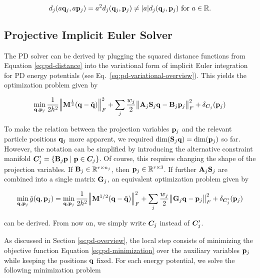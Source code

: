 \[
    d_j(a\mathbf{q}_j, a\mathbf{p}_j) = a^2d_j(\mathbf{q}_j, \mathbf{p}_j) \neq \vert a \vert d_j(\mathbf{q}_j, \mathbf{p}_j) \text{ for } 
    a \in \mathbb{R}. 
\]


\subsection{Projective Implicit Euler Solver}\label{ss:pd-solver}
The PD solver can be derived by plugging the squared distance functions from Equation \ref{eq:pd-distance} into the variational 
form of implicit
Euler integration for PD energy potentials (see Eq.\ \ref{eq:pd-variational-overview}). This yields the optimization problem given by 

\begin{equation}\label{eq:pd-variational}
    \min_{\mathbf{q}, \mathbf{p}_j} \frac{1}{2h^2} \norm{\mathbf{M}^{\frac{1}{2}}(\mathbf{q} - \tilde{\mathbf{q}})}^2_F + 
    \sum_j \frac{w_j}{2} \norm{\mathbf{A}_j\mathbf{S}_j\mathbf{q} - \mathbf{B}_j\mathbf{p}_j}^2_F + \delta_{\bm{C}_j}(\mathbf{p}_j)
\end{equation}

\noindent To make the relation between the projection variables $\mathbf{p}_j$ and the relevant particle positions 
$\mathbf{q}_j$ more apparent, we required $\text{dim}(\mathbf{S}_j\mathbf{q}) = \text{dim}(\mathbf{p}_j)$ so far. However, the 
notation can be simplified by introducing the alternative constraint manifold $\bm{C}^\prime_j = \{ \mathbf{B}_j\mathbf{p} 
\mid \mathbf{p} \in \bm{C}_j \}$. Of course, this requires changing the shape of the projection variables. If 
$\mathbf{B}_j \in \mathbb{R}^{r \times n_j}$, then $\mathbf{p}_j \in \mathbb{R}^{r \times 3}$. If further $\mathbf{A}_j\mathbf{S}_j$ 
are combined into a single matrix $\mathbf{G}_j$, an equivalent optimization problem given by 

\begin{equation}\label{eq:pd-minimization}
    \min_{\mathbf{q}, \mathbf{p}_j} \tilde{g}(\mathbf{q}, \mathbf{p}_j) = 
    \min_{\mathbf{q}, \mathbf{p}_j} \frac{1}{2h^2} \norm{\mathbf{M}^{1/2}(\mathbf{q} - \tilde{\mathbf{q}})}^2_F + \sum_j \frac{w_j}{2} \norm{\mathbf{G}_j\mathbf{q}
    - \mathbf{p}_j}^2_F + \delta_{\bm{C}^\prime_j}(\mathbf{p}_j)
\end{equation}

\noindent can be derived. From now on, we simply write $\bm{C}_j$ instead of $\bm{C}^\prime_j$.

As discussed in Section \ref{ss:pd-overview}, the local step consists of minimizing the objective function 
Equation \ref{eq:pd-minimization} over the auxiliary variables $\mathbf{p}_j$ while keeping the positions $\mathbf{q}$ fixed. For each 
energy potential, we solve the following minimization problem

